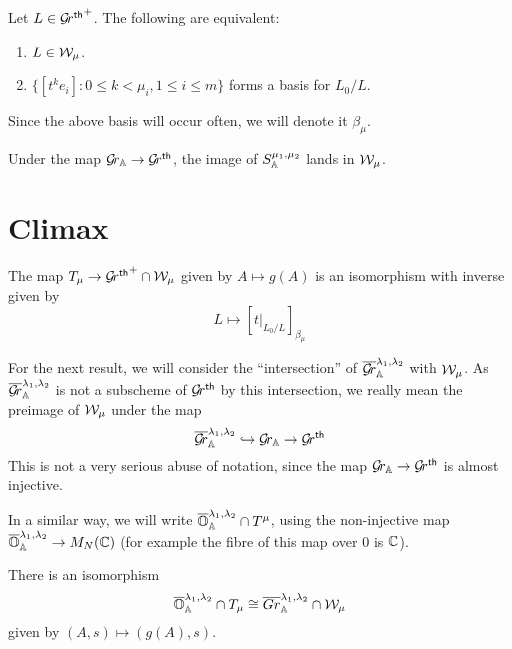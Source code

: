 \documentclass{article}
\begin{document}
\begin{lemma} \label{le:Wmu}
    Let $ L \in \Grth^+$.  The following are equivalent:
    \begin{enumerate}
        \item $ L \in \cW_\mu$.
        \item $ \{ [t^k e_i] : 0 \le k < \mu_i, 1 \le i \le m\}$ forms a basis for $ L_0/L$.
    \end{enumerate}
\end{lemma}

Since the above basis will occur often, we will denote it  $ \beta_\mu$.

\begin{lemma}
    Under the map $ \Grbd \rightarrow \Grth$, the image of $ S^{\mu_1, \mu_2}_\AA$ lands in $ \cW_\mu$.
\end{lemma}

\section{Climax}

\begin{theorem} 
The map $ T_\mu \rightarrow \Grth^+ \cap \cW_\mu $ given by $ A \mapsto g(A) $ is an isomorphism with inverse given by
$$ L \mapsto [t|_{L_0/L} ]_{\beta_\mu}$$
\end{theorem}


For the next result, we will consider the ``intersection'' of $ \overline{\Gr}^{\lambda_1, \lambda_2}_\AA $ with $\cW_\mu$.  As $  \overline{\Gr}^{\lambda_1, \lambda_2}_\AA $ is not a subscheme of $ \Grth$ by this intersection, we really mean the preimage of $ \cW_\mu$ under the map $$ \overline{\Gr}^{\lambda_1, \lambda_2}_\AA  \hookrightarrow \Grbd \rightarrow \Grth$$
This is not a very serious abuse of notation, since the map $ \Grbd \rightarrow \Grth $ is almost injective.

In a similar way, we will write $ \overline{\OO}^{\lambda_1, \lambda_2}_\AA \cap T^\mu$, using the non-injective map $ \overline{\OO}^{\lambda_1, \lambda_2}_\AA \rightarrow M_N(\CC)$ (for example the fibre of this map over $ 0 $ is $ \CC $).

\begin{theorem} \label{th:OGrl}
    There is an isomorphism
    $$\overline{\OO}^{\lambda_1, \lambda_2}_\AA \cap T_\mu \cong \overline{Gr}^{\lambda_1, \lambda_2}_\AA \cap \cW_\mu $$
    given by $ (A,s) \mapsto (g(A), s)$.
\end{theorem}
\end{document}
